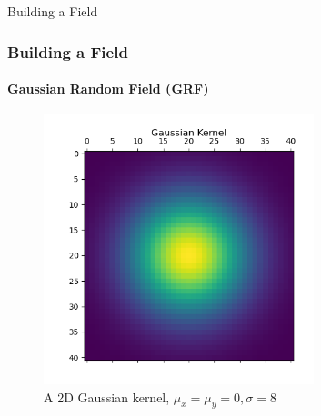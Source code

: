 \documentclass[professionalfont,10pt]{beamer}
\begin{document}
	\begin{frame}[t]{Building a Field}
		\frametitle{Building a Field}
		\framesubtitle{Gaussian Random Field (GRF)}
		\hskip-0.75cm
		\begin{minipage}[t]{0.2\linewidth}\vspace{-0.5cm}
			\tiny\tableofcontents[currentsection,currentsubsection,hideothersubsections,subsectionstyle=show/shaded]
		\end{minipage}
		\hfill%
		\begin{minipage}[t]{0.86\linewidth}\vspace{-0.5cm}
			\begin{figure}[t]
				\centering
				\captionsetup{width=0.9\textwidth}
				\includegraphics[width=0.7\textwidth]{../images/GaussianKernel.png}
				\caption{A 2D Gaussian kernel, $\mu_x = \mu_y = 0, \sigma = 8$}
				\label{CFandEncoder}
			\end{figure}
		\end{minipage}
		\vfill%
	\end{frame}
	
\end{document}
